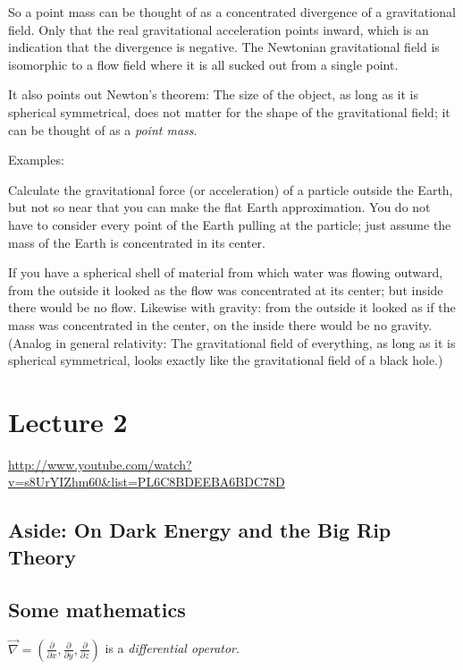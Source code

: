 \documentclass[pagesize,headsepline,10pt,parskip=half,BCOR=12mm]{scrreprt}
\begin{document}
        So a point mass can be thought of as a concentrated
        divergence of a gravitational field.  Only that the real
        gravitational acceleration points inward, which is an
        indication that the divergence is negative.  The Newtonian
        gravitational field is isomorphic to a flow field where it
        is all sucked out from a single point.

        It also points out Newton's theorem: The size of the
        object, as long as it is spherical symmetrical, does not
        matter for the shape of the gravitational field; it can be
        thought of as a \emph{point mass}.

        Examples:
        \begin{compactitem}
          \item Calculate the gravitational force (or acceleration)
            of a particle outside the Earth, but not so near that
            you can make the flat Earth approximation.  You do not
            have to consider every point of the Earth pulling at
            the particle; just assume the mass of the Earth is
            concentrated in its center.
          \item If you have a spherical shell of material from
            which water was flowing outward, from the outside it
            looked as the flow was concentrated at its center; but
            inside there would be no flow. Likewise with gravity:
            from the outside it looked as if the mass was
            concentrated in the center, on the inside there
            would be no gravity.  (Analog in general relativity:
            The gravitational field of everything, as long as it is
            spherical symmetrical, looks exactly like the
            gravitational field of a black hole.)
        \end{compactitem}
  \chapter{Lecture 2}
    \url{http://www.youtube.com/watch?v=s8UrYIZhm60&list=PL6C8BDEEBA6BDC78D}
    \section{Aside: On Dark Energy and the Big Rip Theory}
    \section{Some mathematics}
      $\vec \nabla = \left(\frac{\partial}{\partial x},
      \frac{\partial}{\partial y}, \frac{\partial}{\partial
      z}\right)$ is a \emph{differential operator}.
\end{document}
